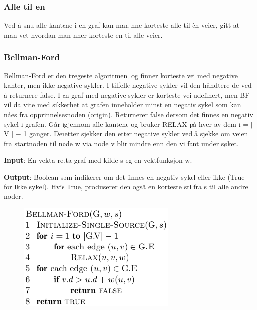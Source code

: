 \documentclass[12pt]{report}
\begin{document}
\subsubsection*{Alle til en}
Ved å snu alle kantene i en graf kan man nne korteste alle-til-én veier, gitt at man vet hvordan man nner korteste en-til-alle veier.


\newpage
\par

\subsubsection*{Bellman-Ford}
\setlength{\parskip}{10.56pt}
Bellman-Ford er den tregeste algoritmen, og finner korteste vei med negative kanter, men ikke negative sykler. I tilfelle negative sykler vil den håndtere de ved å returnere false. I en graf med negative sykler er korteste vei udefinert, men BF vil da vite med sikkerhet at grafen inneholder minst en negativ sykel som kan nåes fra opprinnelsesnoden (origin). Returnerer false dersom det finnes en negativ sykel i grafen. Går igjennom alle kantene og bruker RELAX på hver av dem i = $ \vert $ V $ \vert $  $-$  1 ganger. Deretter sjekker den etter negative sykler ved å sjekke om veien fra startnoden til node w via node v blir mindre enn den vi fant under søket.\par

\textbf{Input}: En vekta retta graf med kilde s og en vektfunksjon w. \par

\textbf{Output}: Boolean som indikerer om det finnes en negativ sykel eller ikke (True for ikke sykel). Hvis True, produserer den også en korteste sti fra s til alle andre noder. \par


\vspace{\baselineskip}

\vspace{\baselineskip}



\begin{figure}[H]
	\begin{Center}
		\includegraphics[width=3.02in,height=2.06in]{./media/image127.png}
	\end{Center}
\end{figure}
\end{document}
